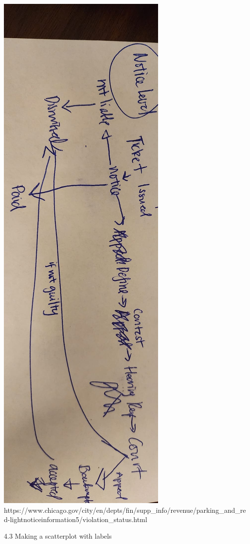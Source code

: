 \documentclass[
  letterpaper,
  DIV=11,
  numbers=noendperiod]{scrartcl}
\begin{document}
\includegraphics{notice_level.jpg}
https://www.chicago.gov/city/en/depts/fin/supp\_info/revenue/parking\_and\_red-lightnoticeinformation5/violation\_status.html

4.3 Making a scatterplot with labels
\end{document}
